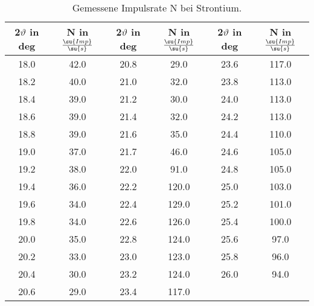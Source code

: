 \begin{table}
  \centering
  \caption{Gemessene Impulsrate N bei Strontium.}
  \label{tab:Strontium}
  \begin{tabular}{c c | c c | c c}
    \toprule
    2$\vartheta$ in deg & N in $\frac{\su{Imp}}{\su{s}}$ & 2$\vartheta$ in deg &
    N in $\frac{\su{Imp}}{\su{s}}$ & 2$\vartheta$ in deg & N in $\frac{\su{Imp}}{\su{s}}$ \\
    \midrule
    18.0 & 42.0 & 20.8 & 29.0  & 23.6 & 117.0 \\
    18.2 & 40.0 & 21.0 & 32.0  & 23.8 & 113.0 \\
    18.4 & 39.0 & 21.2 & 30.0  & 24.0 & 113.0 \\
    18.6 & 39.0 & 21.4 & 32.0  & 24.2 & 113.0 \\
    18.8 & 39.0 & 21.6 & 35.0  & 24.4 & 110.0 \\
    19.0 & 37.0 & 21.7 & 46.0  & 24.6 & 105.0 \\
    19.2 & 38.0 & 22.0 & 91.0  & 24.8 & 105.0 \\
    19.4 & 36.0 & 22.2 & 120.0 & 25.0 & 103.0 \\
    19.6 & 34.0 & 22.4 & 129.0 & 25.2 & 101.0 \\
    19.8 & 34.0 & 22.6 & 126.0 & 25.4 & 100.0 \\
    20.0 & 35.0 & 22.8 & 124.0 & 25.6 & 97.0  \\
    20.2 & 33.0 & 23.0 & 123.0 & 25.8 & 96.0  \\
    20.4 & 30.0 & 23.2 & 124.0 & 26.0 & 94.0  \\
    20.6 & 29.0 & 23.4 & 117.0 &      &       \\
    \bottomrule
  \end{tabular}
\end{table}
